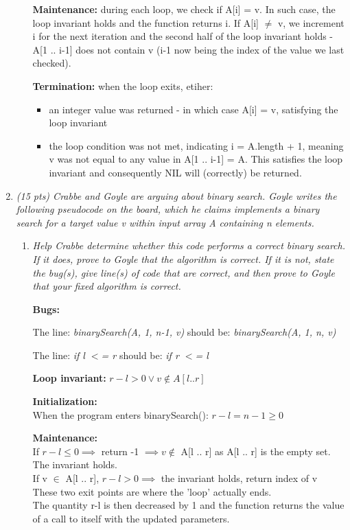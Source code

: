 \documentclass[12pt]{article}
\begin{document}
\begin{enumerate}
\begin{enumerate}
		\textbf{Maintenance:} during each loop, we check if A[i] = v. In such case, the loop invariant holds and the function returns i. If A[i] $\neq$ v, we increment i for the next iteration and the second half of the loop invariant holds - A[1 .. i-1] does not contain v (i-1 now being the index of the value we last checked). 

		\textbf{Termination:} when the loop exits, etiher: 
			\begin{itemize}
				\item an integer value was returned - in which case A[i] = v, satisfying the loop invariant 

				\item the loop condition was not met, indicating i = A.length + 1, meaning v was not equal to any value in A[1 .. i-1] = A. This satisfies the loop invariant and consequently NIL will (correctly) be returned.  
			\end{itemize}

	\end{enumerate}

	\newpage 

	\item \textit{ (15 pts) Crabbe and Goyle are arguing about binary search. Goyle writes the following pseudocode on the board, which he claims implements a binary search for a target value v within input array A containing n elements.}

	\begin{enumerate}

		\item \textit{Help Crabbe determine whether this code performs a correct binary search. If it does, prove to Goyle that the algorithm is correct. If it is not, state the bug(s), give line(s) of code that are correct, and then prove to Goyle that your fixed algorithm is correct.}


		\textbf{Bugs:}

		The line: \textit{binarySearch(A, 1, n-1, v)} 
		should be: \textit{binarySearch(A, 1, n, v)} 

		The line: \textit{if l $<$= r} 
		should be: \textit{if r $<$= l} 

		\textbf{Loop invariant:} $r - l > 0 \vee v \notin A[l .. r]$ 

		\textbf{Initialization:} \\When the program enters binarySearch(): $r - l = n - 1 \geq 0$

		\textbf{Maintenance:} \\If $r - l \leq 0 \implies$ return -1 $\implies v \notin$ A[l .. r] as A[l .. r] is the empty set. The invariant holds.\\
		If v $\in$ A[l .. r], $r - l > 0 \implies$ the invariant holds, return index of v \\
		These two exit points are where the 'loop' actually ends.  \\
		The quantity r-l is then decreased by 1 and the function returns the value of a call to itself with the updated parameters. 


\end{enumerate}
\end{enumerate}
\end{document}
